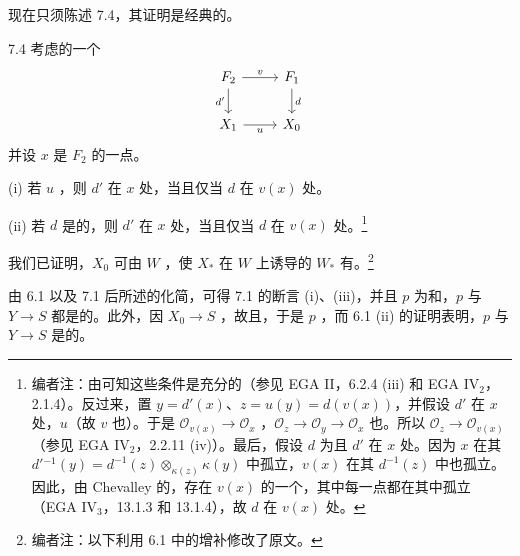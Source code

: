 现在只须陈述 7.4，其证明是经典的。
\begin{SGAresult}{}{7.4}
考虑的一个
\[
\begin{tikzcd}
F_2\arrow[r,"v"]\arrow[d,"d'"']&F_1\arrow[d,"d"]\\
X_1\arrow[r,"u"']&X_0
\end{tikzcd}
\]
并设 $x$ 是 $F_2$ 的一点。

(i) 若 $u$ ，则 $d'$ 在 $x$ 处，当且仅当 $d$ 在 $v(x)$ 处。

(ii) 若 $d$ 是的，则 $d'$ 在 $x$ 处，当且仅当 $d$ 在 $v(x)$ 处。\footnote{编者注：由可知这些条件是充分的（参见 EGA II，6.2.4 (iii) 和 EGA IV$_2$，2.1.4）。反过来，置 $y=d'(x)$、$z=u(y)=d(v(x))$，并假设 $d'$ 在 $x$ 处，$u$（故 $v$ 也）。于是 $\mathcal O_{v(x)}\to\mathcal O_x$ ，$\mathcal O_z\to\mathcal O_y\to\mathcal O_x$ 也。所以 $\mathcal O_z\to\mathcal O_{v(x)}$ （参见 EGA IV$_2$，2.2.11 (iv)）。最后，假设 $d$ 为且 $d'$ 在 $x$ 处。因为 $x$ 在其 $d'{}^{-1}(y)=d^{-1}(z)\otimes_{\kappa(z)}\kappa(y)$ 中孤立，$v(x)$ 在其 $d^{-1}(z)$ 中也孤立。因此，由 Chevalley 的，存在 $v(x)$ 的一个，其中每一点都在其中孤立（EGA IV$_3$，13.1.3 和 13.1.4），故 $d$ 在 $v(x)$ 处。}
\end{SGAresult}
我们已证明，$X_0$ 可由 $W$ ，使 $X_*$ 在 $W$ 上诱导的 $W_*$ 有。\footnote{编者注：以下利用 6.1 中的增补修改了原文。}

由 6.1 以及 7.1 后所述的化简，可得 7.1 的断言 (i)、(iii)，并且 $p$ 为和，$p$ 与 $Y\to S$ 都是的。此外，因 $X_0\to S$ ，故且，于是 $p$ ，而 6.1 (ii) 的证明表明，$p$ 与 $Y\to S$ 是的。

